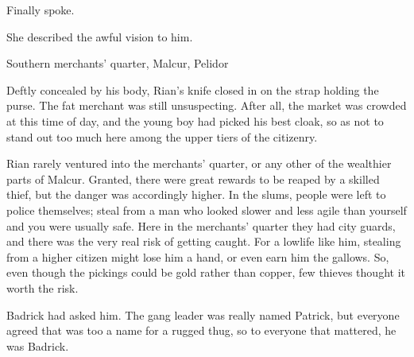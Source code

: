 Finally \Ishnaruchaefir spoke. 

She described the awful vision to him. 










\begin{garbage}

\begin{comment}
\section{Old Version}
\end{comment}

\begin{comment}
\subsection{Rian}
\end{comment}

\stamp
  {\dateIshnaruchaefirSlaysAGhobal}
  {Southern merchants' quarter, Malcur, Pelidor}
%

Deftly concealed by his body, Rian's knife closed in on the strap holding the purse. The fat merchant was still unsuspecting. After all, the market was crowded at this time of day, and the young boy had picked his best cloak, so as not to stand out too much here among the upper tiers of the citizenry. 

Rian rarely ventured into the merchants' quarter, or any other of the wealthier parts of Malcur. Granted, there were great rewards to be reaped by a skilled thief, but the danger was accordingly higher. In the slums, people were left to police themselves; steal from a man who looked slower and less agile than yourself and you were usually safe. Here in the merchants' quarter they had city guards, and there was the very real risk of getting caught. For a lowlife like him, stealing from a higher citizen might lose him a hand, or even earn him the gallows. So, even though the pickings could be gold rather than copper, few thieves thought it worth the risk.

 Badrick had asked him. 
The gang leader was really named Patrick, but everyone agreed that was too  a name for a rugged thug, so to everyone that mattered, he was Badrick. 


\end{garbage}
